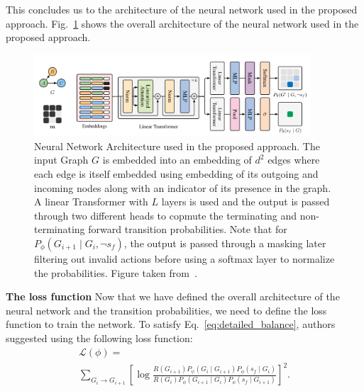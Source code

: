 \documentclass{lxaiproposal}
\begin{document}
    This concludes us to the architecture of the neural network used in the proposed approach. Fig.~\ref{fig:nn_architecture}
    shows the overall architecture of the neural network used in the proposed approach.

    \begin{figure}
        \centering
        \includegraphics[width=0.92\textwidth]{figures/nn_architecture}
        \caption{Neural Network Architecture used in the proposed approach.
        The input Graph $G$ is embedded into an embedding of $d^2$ edges where each edge is itself embedded using
        embedding of its outgoing and incoming nodes along with an indicator of its presence in the graph. A linear Transformer
        with $L$ layers is used and the output is passed through two different heads to copmute the terminating and non-terminating
        forward transition probabilities. Note that for $P_{\phi}(G_{i+1} \mid G_i, \neg s_f)$, the output is passed through a
        masking later filtering out invalid actions before using a softmax layer to normalize the probabilities. Figure taken from~\cite{deleu2022daggflownet}.}
        \label{fig:nn_architecture}
    \end{figure}

    \vspace*{3mm}

    \textbf{The loss function} Now that we have defined the overall architecture of the neural network and the
    transition probabilities, we need to define the loss function to train the network.
    To satisfy Eq.~\eqref{eq:detailed_balance}, authors suggested using the following loss function:
    \begin{equation}
        \begin{array}{l}
            \mathcal{L}(\phi) = \\
            \sum_{G_i \to G_{i+1}} \left[ \log
            \frac{R(G_{i+1})P_{\psi}(G_i \mid G_{i+1})P_{\phi}(s_f \mid G_i)}{R(G_i)P_{\phi}(G_{i+1} \mid G_i)P_{\phi}(s_f \mid G_{i+1})} \right]^2 .
        \end{array}
        \label{eq:loss_function}
    \end{equation}
\end{document}
